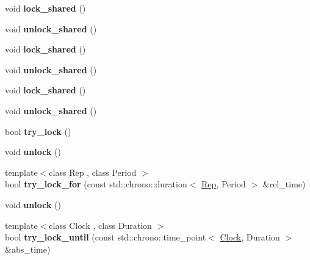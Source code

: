 \begin{DoxyCompactItemize}
\item 
\mbox{\label{structmutex_a10783f3fb3f8fee9e5cf47d07dacdfa3}} 
void {\bfseries lock\+\_\+shared} ()
\item 
\mbox{\label{structmutex_acd087c9ce5458dae0ddea9f7400f4a41}} 
void {\bfseries unlock\+\_\+shared} ()
\item 
\mbox{\label{structmutex_a10783f3fb3f8fee9e5cf47d07dacdfa3}} 
void {\bfseries lock\+\_\+shared} ()
\item 
\mbox{\label{structmutex_acd087c9ce5458dae0ddea9f7400f4a41}} 
void {\bfseries unlock\+\_\+shared} ()
\item 
\mbox{\label{structmutex_a10783f3fb3f8fee9e5cf47d07dacdfa3}} 
void {\bfseries lock\+\_\+shared} ()
\item 
\mbox{\label{structmutex_acd087c9ce5458dae0ddea9f7400f4a41}} 
void {\bfseries unlock\+\_\+shared} ()
\item 
\mbox{\label{structmutex_a48d24ab31558fc5b5fda1be4ee8caa57}} 
bool {\bfseries try\+\_\+lock} ()
\item 
\mbox{\label{structmutex_a362d78bead80c2899d89444380cab1bd}} 
void {\bfseries unlock} ()
\item 
\mbox{\label{structmutex_a2e49032b68d81d748f7ba7e52a7772c9}} 
{\footnotesize template$<$class Rep , class Period $>$ }\\bool {\bfseries try\+\_\+lock\+\_\+for} (const std\+::chrono\+::duration$<$ \mbox{\hyperlink{class_rep}{Rep}}, Period $>$ \&rel\+\_\+time)
\item 
\mbox{\label{structmutex_a362d78bead80c2899d89444380cab1bd}} 
void {\bfseries unlock} ()
\item 
\mbox{\label{structmutex_abe7298f1787573596630c6d9e27483c9}} 
{\footnotesize template$<$class Clock , class Duration $>$ }\\bool {\bfseries try\+\_\+lock\+\_\+until} (const std\+::chrono\+::time\+\_\+point$<$ \mbox{\hyperlink{struct_clock}{Clock}}, Duration $>$ \&abs\+\_\+time)

\end{DoxyCompactItemize}
